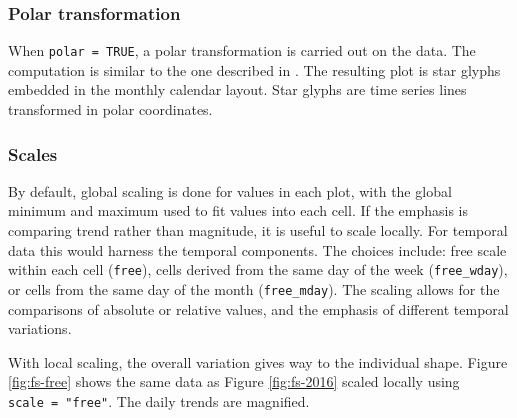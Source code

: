 \documentclass[12pt]{article}
\begin{document}
\hypertarget{polar-transformation}{%
\subsubsection{Polar transformation}\label{polar-transformation}}

When \texttt{polar\ =\ TRUE}, a polar transformation is carried out on the data. The computation is similar to the one described in \citet{Wickham2012glyph}. The resulting plot is star glyphs embedded in the monthly calendar layout. Star glyphs are time series lines transformed in polar coordinates.



\hypertarget{scales}{%
\subsubsection{Scales}\label{scales}}

By default, global scaling is done for values in each plot, with the global minimum and maximum used to fit values into each cell. If the emphasis is comparing trend rather than magnitude, it is useful to scale locally. For temporal data this would harness the temporal components. The choices include: free scale within each cell (\texttt{free}), cells derived from the same day of the week (\texttt{free\_wday}), or cells from the same day of the month (\texttt{free\_mday}). The scaling allows for the comparisons of absolute or relative values, and the emphasis of different temporal variations.

With local scaling, the overall variation gives way to the individual shape. Figure \ref{fig:fs-free} shows the same data as Figure \ref{fig:fs-2016} scaled locally using \texttt{scale\ =\ "free"}. The daily trends are magnified.
\end{document}
